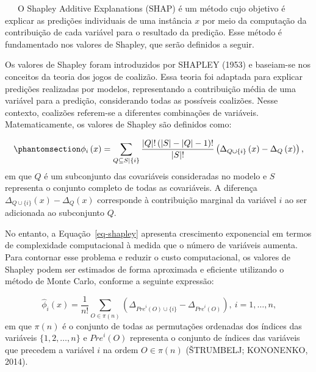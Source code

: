 \documentclass[
  12pt,
  a4paper,
]{scrreprt}
\begin{document}
~~~O Shapley Additive Explanations (SHAP) é um método cujo objetivo é
explicar as predições individuais de uma instância \(x\) por meio da
computação da contribuição de cada variável para o resultado da
predição. Esse método é fundamentado nos valores de Shapley, que serão
definidos a seguir.

\vspace{12pt}

Os valores de Shapley foram introduzidos por SHAPLEY (1953) e baseiam-se
nos conceitos da teoria dos jogos de coalizão. Essa teoria foi adaptada
para explicar predições realizadas por modelos, representando a
contribuição média de uma variável para a predição, considerando todas
as possíveis coalizões. Nesse contexto, coalizões referem-se a
diferentes combinações de variáveis. Matematicamente, os valores de
Shapley são definidos como:

\begin{equation}\phantomsection\label{eq-shapley}{
\phi_i\left(x\right) = \sum_{Q \subseteq S | \{i\}} \frac{|Q|!\left(|S| - |Q| - 1\right)!}{|S|!} \left(\Delta_{Q\cup \{i\}}\left(x\right) - \Delta_{Q}\left(x\right)\right)\text{,}
}\end{equation} em que \(Q\) é um subconjunto das covariáveis
consideradas no modelo e \(S\) representa o conjunto completo de todas
as covariáveis. A diferença
\(\Delta_{Q \cup \{i\}}\left(x\right) - \Delta_{Q}\left(x\right)\)
corresponde à contribuição marginal da variável \(i\) ao ser adicionada
ao subconjunto \(Q\).

\vspace{12pt}

No entanto, a Equação~\ref{eq-shapley} apresenta crescimento exponencial
em termos de complexidade computacional à medida que o número de
variáveis aumenta. Para contornar esse problema e reduzir o custo
computacional, os valores de Shapley podem ser estimados de forma
aproximada e eficiente utilizando o método de Monte Carlo, conforme a
seguinte expressão:

\[
\hat{\phi}_{i}\left(x\right) = \frac{1}{n!} \sum_{O \in \pi \left(n \right)} \left( \Delta_{{Pre}^{i} \left(O\right) \cup \{i\}} - \Delta_{{Pre}^{i} \left(O\right)} \right), \ i = 1, \dots, n\text{,}
\] em que \(\pi\left(n\right)\) é o conjunto de todas as permutações
ordenadas dos índices das variáveis \(\{1, 2, \dots, n\}\) e
\({Pre}^{i}\left(O\right)\) representa o conjunto de índices das
variáveis que precedem a variável \(i\) na ordem
\(O \in \pi \left(n\right)\) (ŠTRUMBELJ; KONONENKO, 2014).
\end{document}
